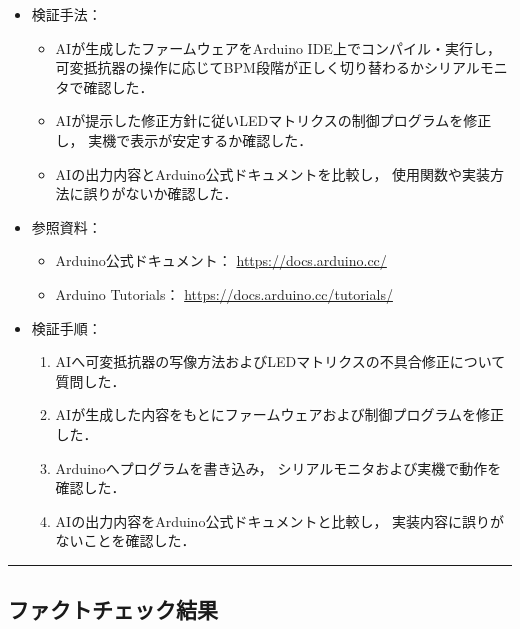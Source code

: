 \documentclass[uplatex,dvipdfmx,a4paper,11pt]{jsarticle}
\newcommand{\sectionrule}{\par\medskip\noindent\rule{\linewidth}{0.6pt}\par\medskip}
\begin{document}
\begin{itemize}

    \item 検証手法：
      \begin{itemize}
        \item AIが生成したファームウェアをArduino IDE上でコンパイル・実行し，
        可変抵抗器の操作に応じてBPM段階が正しく切り替わるかシリアルモニタで確認した．

        \item AIが提示した修正方針に従いLEDマトリクスの制御プログラムを修正し，
        実機で表示が安定するか確認した．

        \item AIの出力内容とArduino公式ドキュメントを比較し，
        使用関数や実装方法に誤りがないか確認した．
      \end{itemize}

      \item 参照資料：
      \begin{itemize}
        \item Arduino公式ドキュメント：
        \url{https://docs.arduino.cc/}

        \item Arduino Tutorials：
        \url{https://docs.arduino.cc/tutorials/}
      \end{itemize}

      \item 検証手順：
    \begin{enumerate}
      \item AIへ可変抵抗器の写像方法およびLEDマトリクスの不具合修正について質問した．

      \item AIが生成した内容をもとにファームウェアおよび制御プログラムを修正した．

      \item Arduinoへプログラムを書き込み，
      シリアルモニタおよび実機で動作を確認した．

      \item AIの出力内容をArduino公式ドキュメントと比較し，
      実装内容に誤りがないことを確認した．
    \end{enumerate}

\end{itemize}


\sectionrule

\subsection{ファクトチェック結果}
\end{document}
